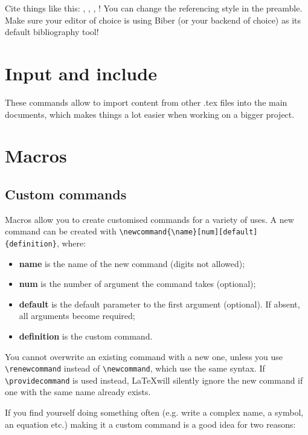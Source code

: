 \documentclass[12pt, letterpaper]{article} %
\begin{document}
Cite things like this: 
\cite{dirac}, 
\cite{einstein}, 
\cite{knuth-fa}, 
\cite{knuthwebsite}! You can change the referencing style in the preamble. 
Make sure your editor of choice is using Biber (or your backend of choice) 
as its default bibliography tool!

\printbibliography

\clearpage

\section{Input and include}

These commands allow to import content from other .tex files into the main 
documents, which makes things a lot easier when working on a bigger project.



\section{Macros}
\subsection{Custom commands}

Macros allow you to create customised commands for a variety of uses. A new 
command can be created with \verb+\newcommand{\name}[num][default]{definition}+,
where:

\begin{itemize}
	\item \textbf{name} is the name of the new command (digits not allowed);
	\item \textbf{num} is the number of argument the command takes (optional);
	\item \textbf{default} is the default parameter to the first argument 
	(optional). If absent, all arguments become required;
	\item \textbf{definition} is the custom command.
\end{itemize}

You cannot overwrite an existing command with a new one, unless you use
\verb+\renewcommand+ instead of \verb+\newcommand+, which use the same syntax.
If \verb+\providecommand+ is used instead, \LaTeX will silently ignore the new
command if one with the same name already exists.

If you find yourself doing something often (e.g. write a complex name, a symbol,
an equation etc.) making it a custom command is 
a good idea for two reasons:
\end{document}
